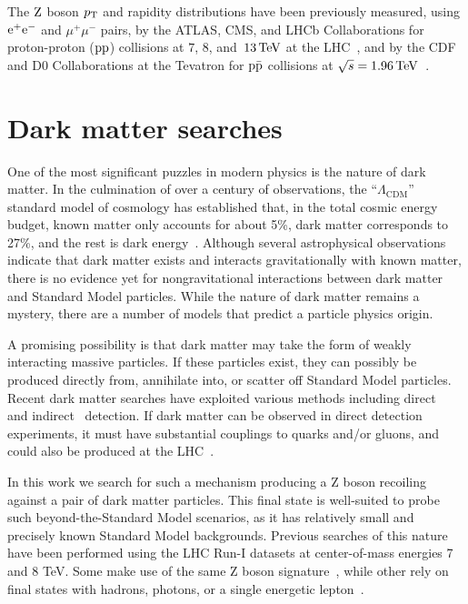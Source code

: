 The $\mathrm{Z}$ boson $p_{\mathrm{T}}$ and rapidity distributions have been previously 
measured, using $\mathrm{e}^+\mathrm{e}^-$ and $\mu^+\mu^-$ pairs, by the ATLAS, CMS, and 
LHCb Collaborations for proton-proton ($\mathrm{p}\mathrm{p}$) collisions at $7$, $8$, 
and~$13\,\text{Te\hspace{-.08em}V}$ at the LHC~\cite{ATLAS_ZpT7TeV,ATLAS_ZptEta7TeV,Aad:2015auj,Aaboud:2016btc,Sirunyan:2018owv,CMS_ZpT7TeV,CMS_ZpT8TeV,CMS:2014jea,Khachatryan:2016nbe,LHCb_WZ7TeV,LHCb_Zee7TeV,LHCb_ZpT7TeV,LHCb_WZ8TeV,Aaij:2016mgv}, 
and by the CDF and D0 Collaborations at the Tevatron for $\mathrm{p}\bar{\mathrm{p}}$ 
collisions at $\sqrt{s} = 1.96\,\text{Te\hspace{-.08em}V}$~\cite{Affolder:1999jh,Abbott:1999yd,TevatronWZ:D0PhysRevLett2008_100,TevatronWZ:D0PhysLettB2010_693,TevatronWZ:D0PhysRevLett2011_106}. 

\section{Dark matter searches}

One of the most significant puzzles in modern physics is the nature of dark matter.
In the culmination of over a century of observations, the ``$\Lambda_{\mathrm{CDM}}$'' standard model of cosmology
has established that, in the total cosmic energy budget,
known matter only accounts for about 5\%, dark matter corresponds to 27\%, and the rest is dark energy~\cite{Hinshaw_2013}.
Although several astrophysical observations indicate that dark matter exists and interacts gravitationally with known matter,
there is no evidence yet for nongravitational interactions between dark matter and Standard Model particles.
While the nature of dark matter remains a mystery, there are a number of models that predict a particle physics origin. 

A promising possibility is that dark matter may take the form of weakly interacting massive particles.
If these particles exist, they can possibly be produced directly from, annihilate into, or scatter off Standard Model particles.
Recent dark matter searches have exploited various methods including direct~\cite{Cushman:2013zza} and indirect~\cite{Buckley:2013bha} detection.
If dark matter can be observed in direct detection experiments,
it must have substantial couplings to quarks and/or gluons, and could also be produced at the LHC~\cite{Beltran:2010ww,Goodman:2010yf,Bai:2010hh,Goodman:2010ku,Fox:2011pm,Rajaraman:2011wf}.

In this work we search for such a mechanism producing a Z boson recoiling against a pair of dark matter particles.
This final state is well-suited to probe such beyond-the-Standard Model scenarios, as
it has relatively small and precisely known Standard Model backgrounds.
Previous searches of this nature have been performed using the LHC Run-I datasets at center-of-mass energies 7 and 8 TeV.
Some make use of the same Z boson signature~\cite{Chatrchyan:2014tja,Khachatryan:2015bbl,Aad:2014vka},
while other rely on final states with hadrons, photons, or a single energetic lepton~\cite{Aad:2013oja,ATLAS:2014wra,Khachatryan:2014tva,Aad:2014vea,Aad:2014tda,Khachatryan:2014uma,Aad:2014wza,Aad:2015yga,Khachatryan:2015nua,Khachatryan:2014rra,Aad:2015zva,Khachatryan:2014rwa,Khachatryan:2016mdm}.

